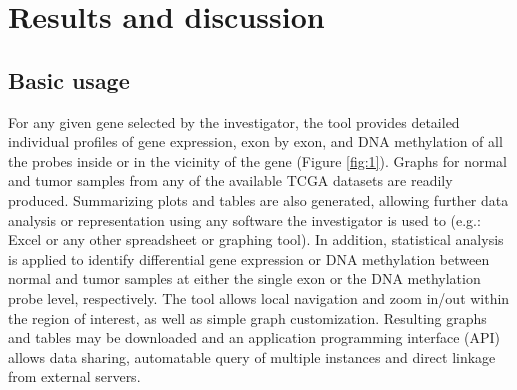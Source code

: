 \documentclass{bmcart}
\begin{document}


\section*{Results and discussion}

\subsection*{Basic usage}


For any given gene selected by the investigator, the tool provides detailed individual profiles of gene expression, exon by exon, and DNA methylation of all the probes inside or in the vicinity of the gene (Figure \ref{fig:1}). Graphs for normal and tumor samples from any of the available TCGA datasets are readily produced. Summarizing plots and tables are also generated, allowing further data analysis or representation using any software the investigator is used to (e.g.: Excel or any other spreadsheet or graphing tool). In addition, statistical analysis is applied to identify differential gene expression or DNA methylation between normal and tumor samples at either the single exon or the DNA methylation probe level, respectively. The tool allows local navigation and zoom in/out within the region of interest, as well as simple graph customization. Resulting graphs and tables may be downloaded and an application programming interface (API) allows data sharing, automatable query of multiple instances and direct linkage from external servers.\\
\end{document}
